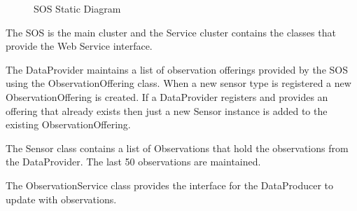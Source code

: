 \documentclass[]{final_report}
\begin{document}
 \begin{figure}[h!]
\centering
{}
\caption{SOS Static Diagram}\label{fig:bon_static_diagam_provider.png}
\end{figure}
The SOS is the main cluster and the Service cluster contains the classes that provide the Web Service interface.

The DataProvider maintains a list of observation offerings provided by the SOS using the ObservationOffering class. When a new sensor type is registered a new ObservationOffering is created. If a DataProvider registers and provides an offering that already exists then just a new Sensor instance is added to the existing ObservationOffering.
 
The Sensor class contains a list of Observations that hold the observations from the DataProvider. The last 50 observations are maintained.

The ObservationService class provides the interface for the DataProducer to update with observations.
\end{document}
